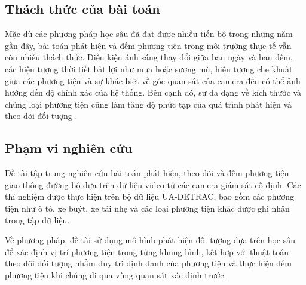\subsection{Thách thức của bài toán}

Mặc dù các phương pháp học sâu đã đạt được nhiều tiến bộ trong những năm gần
đây, bài toán phát hiện và đếm phương tiện trong môi trường thực tế vẫn còn
nhiều thách thức. Điều kiện ánh sáng thay đổi giữa ban ngày và ban đêm, các
hiện tượng thời tiết bất lợi như mưa hoặc sương mù, hiện tượng che khuất giữa
các phương tiện và sự khác biệt về góc quan sát của camera đều có thể ảnh hưởng
đến độ chính xác của hệ thống. Bên cạnh đó, sự đa dạng về kích thước và chủng
loại phương tiện cũng làm tăng độ phức tạp của quá trình phát hiện và theo dõi
đối tượng \cite{YANG2018143}.

\subsection{Phạm vi nghiên cứu}

Đề tài tập trung nghiên cứu bài toán phát hiện, theo dõi và đếm phương tiện
giao thông đường bộ dựa trên dữ liệu video từ các camera giám sát cố định. Các
thí nghiệm được thực hiện trên bộ dữ liệu UA-DETRAC, bao gồm các phương tiện
như ô tô, xe buýt, xe tải nhẹ và các loại phương tiện khác được ghi nhận trong
tập dữ liệu.

Về phương pháp, đề tài sử dụng mô hình phát hiện đối tượng dựa trên học sâu để
xác định vị trí phương tiện trong từng khung hình, kết hợp với thuật toán theo
dõi đối tượng nhằm duy trì định danh của phương tiện và thực hiện đếm phương
tiện khi chúng đi qua vùng quan sát xác định trước.
